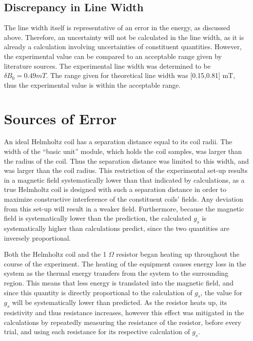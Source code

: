 \documentclass[a4paper]{article}
\begin{document}
\subsection{Discrepancy in Line Width}
\qq The line width itself is representative of an error in the energy,
as discussed above. Therefore, an uncertainty will not be calculated
in the line width, as it is already a calculation involving
uncertainties of constituent quantities. However, the experimental
value can be compared to an acceptable range given by literature
sources. The experimental line width was determined to be $\delta B_0
= 0.49 mT$. The range given for theoretical line width was [0.15,0.81]
mT, thus the experimental value is within the acceptable range.

\section{Sources of Error}
\qq An ideal Helmholtz coil has a separation distance equal to its coil radii. The width of the ``basic unit'' module, which holds
the coil samples, was larger than the radius of the coil. Thus the
separation distance was limited to this width, and was larger than the coil radius. This restriction of the experimental set-up results in a magnetic field systematically lower than that indicated by calculations, as a true Helmholtz coil is
designed with such a separation distance in order to maximize constructive interference of the constituent coils' fields. Any deviation from this set-up will result in a weaker field.  Furthermore,
because the magnetic field is systematically lower than the
prediction, the calculated $g_s$ is systematically higher than calculations predict, since the two quantities are inversely proportional.

\qq Both the Helmholtz coil and the 1 $\Omega$ resistor began heating up throughout the course of the experiment. The heating of the equipment
causes energy loss in the system as the
thermal energy transfers from the system to the surrounding region. This means that less energy is translated into the magnetic field, and since this quantity is directly proportional to the calculation of $g_s$, the value for $g_s$ will be systematically lower than predicted. As the
resistor heats up, its resistivity and thus resistance increases, however this effect was mitigated in the calculations by repeatedly measuring the resistance of the resistor, before every trial, and using each resistance for its respective calculation of $g_s$.
\end{document}
